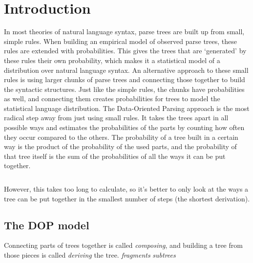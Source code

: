 
\section{Introduction}




In most theories of natural language syntax, parse trees are built up from small, simple rules. 
When building an empirical model of observed parse trees, these rules are extended with probabilities. This gives the trees that are `generated' by these rules their own probability, which makes it a statistical model of a distribution over natural language syntax.
An alternative approach to these small rules is using larger chunks of parse trees and connecting those together to build the syntactic structures. 
Just like the simple rules, the chunks have probabilities as well, and connecting them creates probabilities for trees to model the statistical language distribution.
The Data-Oriented Parsing approach is the most radical step away from just using small rules. It takes the trees apart in all possible ways and estimates the probabilities of the parts by counting how often they occur compared to the others. The probability of a tree built in a certain way is the product of the probability of the used parts, and the probability of that tree itself is the sum of the probabilities of all the ways it can be put together. %

$$$$

However, this takes too long to calculate, so it's better to only look at the ways a tree can be put together in the smallest number of steps (the shortest derivation).

\subsection{The DOP model}

Connecting parts of trees together is called \emph{composing}, and building a tree from those pieces is called \emph{deriving} the tree.
\emph{fragments}
\emph{subtrees}

